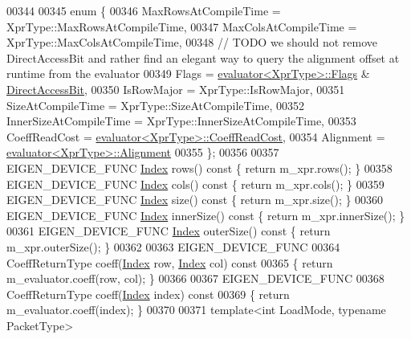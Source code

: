 \begin{DoxyCode}
00344   
00345   \textcolor{keyword}{enum} \{
00346     MaxRowsAtCompileTime = XprType::MaxRowsAtCompileTime,
00347     MaxColsAtCompileTime = XprType::MaxColsAtCompileTime,
00348     \textcolor{comment}{// TODO we should not remove DirectAccessBit and rather find an elegant way to query the alignment
       offset at runtime from the evaluator}
00349     Flags = \hyperlink{struct_eigen_1_1internal_1_1evaluator}{evaluator<XprType>::Flags} & ~
      \hyperlink{group__flags_gabf1e9d0516a933445a4c307ad8f14915}{DirectAccessBit},
00350     IsRowMajor = XprType::IsRowMajor,
00351     SizeAtCompileTime = XprType::SizeAtCompileTime,
00352     InnerSizeAtCompileTime = XprType::InnerSizeAtCompileTime,
00353     CoeffReadCost = \hyperlink{struct_eigen_1_1internal_1_1evaluator}{evaluator<XprType>::CoeffReadCost},
00354     Alignment = \hyperlink{struct_eigen_1_1internal_1_1evaluator}{evaluator<XprType>::Alignment}
00355   \};
00356   
00357   EIGEN\_DEVICE\_FUNC \hyperlink{namespace_eigen_a62e77e0933482dafde8fe197d9a2cfde}{Index} rows()\textcolor{keyword}{ const }\{ \textcolor{keywordflow}{return} m\_xpr.rows(); \}
00358   EIGEN\_DEVICE\_FUNC \hyperlink{namespace_eigen_a62e77e0933482dafde8fe197d9a2cfde}{Index} cols()\textcolor{keyword}{ const }\{ \textcolor{keywordflow}{return} m\_xpr.cols(); \}
00359   EIGEN\_DEVICE\_FUNC \hyperlink{namespace_eigen_a62e77e0933482dafde8fe197d9a2cfde}{Index} size()\textcolor{keyword}{ const }\{ \textcolor{keywordflow}{return} m\_xpr.size(); \}
00360   EIGEN\_DEVICE\_FUNC \hyperlink{namespace_eigen_a62e77e0933482dafde8fe197d9a2cfde}{Index} innerSize()\textcolor{keyword}{ const }\{ \textcolor{keywordflow}{return} m\_xpr.innerSize(); \}
00361   EIGEN\_DEVICE\_FUNC \hyperlink{namespace_eigen_a62e77e0933482dafde8fe197d9a2cfde}{Index} outerSize()\textcolor{keyword}{ const }\{ \textcolor{keywordflow}{return} m\_xpr.outerSize(); \}
00362 
00363   EIGEN\_DEVICE\_FUNC
00364   CoeffReturnType coeff(\hyperlink{namespace_eigen_a62e77e0933482dafde8fe197d9a2cfde}{Index} row, \hyperlink{namespace_eigen_a62e77e0933482dafde8fe197d9a2cfde}{Index} col)\textcolor{keyword}{ const}
00365 \textcolor{keyword}{  }\{ \textcolor{keywordflow}{return} m\_evaluator.coeff(row, col); \}
00366 
00367   EIGEN\_DEVICE\_FUNC
00368   CoeffReturnType coeff(\hyperlink{namespace_eigen_a62e77e0933482dafde8fe197d9a2cfde}{Index} index)\textcolor{keyword}{ const}
00369 \textcolor{keyword}{  }\{ \textcolor{keywordflow}{return} m\_evaluator.coeff(index); \}
00370 
00371   \textcolor{keyword}{template}<\textcolor{keywordtype}{int} LoadMode, \textcolor{keyword}{typename} PacketType>

\end{DoxyCode}
